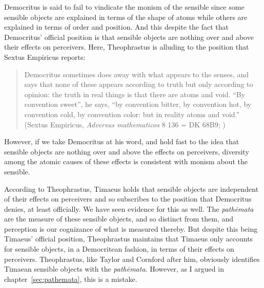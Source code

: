 Democritus is said to fail to vindicate the monism of the sensible since some sensible objects are explained in terms of the shape of atoms while others are explained in terms of order and position. And this despite the fact that Democritus' official position is that sensible objects are nothing over and above their effects on perceivers. Here, Theophrastus is alluding to the position that Sextus Empiricus reports:
\begin{quote}
	Democritus sometimes does away with what appears to the senses, and says that none of these appears according to truth but only according to opinion: the truth in real things is that there are atoms and void. ``By convention sweet'', he says, ``by convention bitter, by convention hot, by convention cold, by convention color: but in reality atoms and void.'' (Sextus Empiricus, \emph{Adversus mathematicos} 8 136 = DK 68B9; \citealt[410]{Kirk:1983ly})
\end{quote}
However, if we take Democritus at his word, and hold fast to the idea that sensible objects are nothing over and above the effects on perceivers, diversity among the atomic causes of these effects is consistent with monism about the sensible.

According to Theophrastus, Timaeus holds that sensible objects are independent of their effects on perceivers and so subscribes to the position that Democritus denies, at least officially. We have seen evidence for this as well. The \emph{pathēmata} are the measure of these sensible objects, and so distinct from them, and perception is our cognizance of what is measured thereby. But despite this being Timaeus' official position, Theophrastus maintains that Timaeus only accounts for sensible objects, in a Democritean fashion, in terms of their effects on perceivers. Theophrastus, like Taylor and Cornford after him, obviously identifies Timaean sensible objects with the \emph{pathēmata}. However, as I argued in chapter~\ref{sec:pathemata}, this is a mistake.

